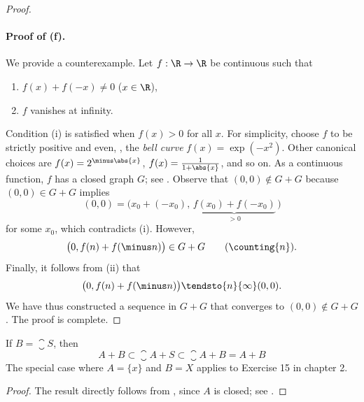 \begin{proof}
\paragraph{Proof of (f).} We provide a counterexample. Let $f: \R \to \R$ be continuous such that 
%
\begin{enumerate}[item-label=(\roman{enumi})]
  \item $f(x) + f(\minus x) \neq 0$ \qquad ($x \in \R$),
  \item $f$ vanishes at infinity. 
\end{enumerate} 
% 
Condition (i) is satisfied when $f(x) > 0 $ for all $x$. For simplicity, choose $f$ to be strictly positive and even, \eg, the 
\emph{bell curve} $f(x)= \exp(\minus x^2)$. Other canonical choices are $f(x)=2^{\minus\abs{x}}$, $f(x)=\frac{1}{1+\abs{x}}$, %
and so on. As a continuous function, $f$ has a closed graph $G$; see . Observe that $(0, 0)\notin G+G$ because %
$(0, 0) \in G+G$ implies
% 
\begin{equation}
  (0, 0) =  \bigl(x_0 + (\minus x_0), \, \underbrace{f(x_0)+ f(\minus x_0)}_{> 0}\,\bigr) %
\end{equation}
%
for some $x_0$, which contradicts (i). However, 
%
\begin{equation}
  \bigl(0, f(n) + f(\minus n)\bigr) \in G + G \qquad (\counting{n}).
\end{equation}
%
%
Finally, it follows from (ii) that %
%
\begin{equation}
  \bigl(0, f(n)+f(\minus n)\bigr) \tendsto{n}{\infty} (0, 0). 
\end{equation}
%
We have thus constructed a sequence in $G+G$ that converges to $(0,0) \notin G+G$. The proof is complete. 
%
\end{proof}
%
\begin{lemma}[Corollary to (e)]
If $B = \closure{S}$, then %
%
\begin{equation}
  A+B \subset \closure{A+S} \subset \closure{A+B} = A + B
\end{equation}
%
The special case where $A = \{x\}$ and $B=X$ applies to Exercise 15 in chapter 2.
\end{lemma}
%
\begin{proof}
The result directly follows from , since $A$ is closed; see . 
\end{proof}
% 
